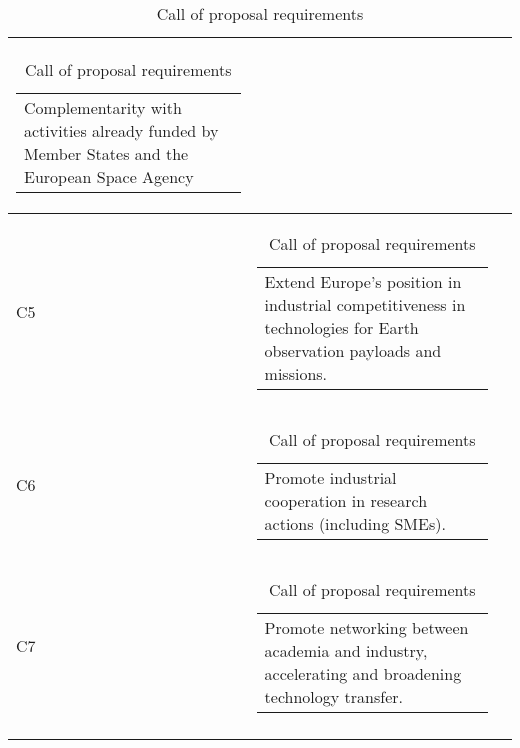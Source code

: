 \begin{longtable}[H]{l c c}
\begin{tabular}[c]{@{}l@{}}
\begin{minipage}[t]{\linewidth}
Complementarity with activities already funded by Member States and the European Space Agency \vspace{0.3cm}
	\end{minipage} \end{tabular}                                                                                                                                           \\  \midrule
	C5 & \begin{tabular}[c]{@{}l@{}}\begin{minipage}[t]{\linewidth}
Extend Europe's position in industrial competitiveness in technologies for Earth observation payloads and missions. \vspace{0.3cm}
	\end{minipage} \end{tabular}                                                                                                                                             \\  \midrule
	C6 & \begin{tabular}[c]{@{}l@{}}\begin{minipage}[t]{\linewidth}
			Promote industrial cooperation in research actions (including SMEs). \vspace{0.3cm}
	\end{minipage} \end{tabular}                                                                                                                                          \\  \midrule
	C7 & \begin{tabular}[c]{@{}l@{}}\begin{minipage}[t]{\linewidth}
			Promote networking between academia and industry, accelerating and broadening technology transfer. \vspace{0.3cm}
	\end{minipage} \end{tabular}                                                                                                                                             \\                                                                   	\bottomrule[2pt]
	\caption{Call of proposal requirements}
\end{longtable}

